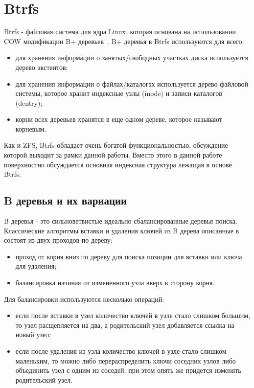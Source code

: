 \section{Btrfs}

Btrfs - файловая система для ядра Linux, которая основана на использовании COW
модификации B+ деревьев~\cite{BCOW}. B+ деревья в Btrfs используются для всего:
\begin{itemize}
  \item для хранения информации о занятых/свободных участках диска используется
        дерево экстентов;
  \item для хранения информации о файлах/каталогах используется дерево файловой
        системы, которое хранит индексные узлы (inode) и записи каталогов
        (dentry);
  \item корни всех деревьев хранятся в еще одном дереве, которое называют
        корневым.
\end{itemize}

Как и ZFS, Btrfs обладает очень богатой функциональностью, обсуждение которой
выходит за рамки данной работы. Вместо этого в данной работе поверхностно
обсуждается основная индексная структура лежащая в основе Btrfs.

\subsection{B деревья и их вариации}

B деревья - это сильноветвистые идеально сбалансированные деревья поиска.
Классические алгоритмы вставки и удаления ключей из B дерева описанные в
~\cite{BTree} состоят из двух проходов по дереву:
\begin{itemize}
  \item проход от корня вниз по дереву для поиска позиции для вставки или ключа
        для удаления;
  \item балансировка начиная от измененного узла вверх в сторону корня.
\end{itemize}

Для балансировки используются несколько операций:
\begin{itemize}
  \item если после вставки в узел количество ключей в узле стало слишком
        большим, то узел расщепляется на два, а родительский узел добавляется
        ссылка на новый узел;
  \item если после удаления из узла количество ключей в узле стало слишком
        маленьким, то можно либо перераспределить ключи соседних узлов либо
        объединить узел с одним из соседей, при этом опять же придется изменять
        родительский узел.
\end{itemize}

